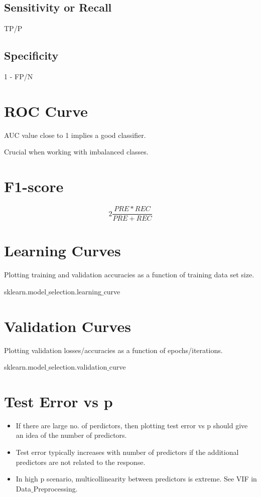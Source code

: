 \documentclass[a4paper, 12pt]{report}
\begin{document}
\subsection{Sensitivity or Recall}
TP/P

\subsection{Specificity}
1 - FP/N

\section{ROC Curve}
AUC value close to 1 implies a good classifier.

Crucial when working with imbalanced classes.

\section{F1-score}

$$2 \frac{PRE \ast REC}{PRE + REC}$$


\section{Learning Curves}
Plotting training and validation accuracies as a function of training data set size.

sklearn.model$\_$selection.learning$\_$curve

\section{Validation Curves}
Plotting validation losses/accuracies as a function of epochs/iterations.

sklearn.model$\_$selection.validation$\_$curve

\section{Test Error vs p}
\begin{itemize}
\item If there are large no. of perdictors, then plotting test error vs p should give an idea of the number of predictors.
\item Test error typically increases with number of predictors if the additional predictors are not related to the response.
\item In high p scenario, multicollinearity between predictors is extreme. See VIF in Data$\_$Preprocessing.
\end{itemize}
\end{document}
